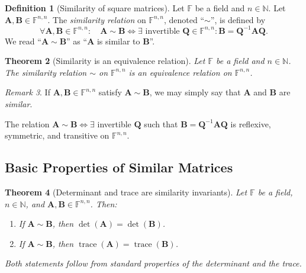 \documentclass[11pt, a4paper, notitlepage]{report}
\newtheorem{theorem}{Theorem}[section]
\theoremstyle{definition}
\newtheorem{definition}[theorem]{Definition}
\theoremstyle{remark}
\newtheorem{remark}[theorem]{Remark}
\begin{document}
\begin{definition}[Similarity of square matrices]\label{def:similarity}
Let $\mathbb{F}$ be a field and $n \in \mathbb{N}$. Let $\mathbf{A}, \mathbf{B} \in
\mathbb{F}^{n,n}$. The \emph{similarity relation} on $\mathbb{F}^{n,n}$, denoted
``$\sim$'', is defined by
\[
  \forall \mathbf{A}, \mathbf{B} \in \mathbb{F}^{n,n} : \quad
  \mathbf{A} \sim \mathbf{B}
  \iff
  \exists \text{ invertible } \mathbf{Q} \in \mathbb{F}^{n,n} : \mathbf{B} = \mathbf{Q}^{-1}\mathbf{A}\mathbf{Q}.
\]
We read ``$\mathbf{A} \sim \mathbf{B}$'' as ``$\mathbf{A}$ is similar to $\mathbf{B}$''.
\end{definition}

\begin{theorem}[Similarity is an equivalence relation]\label{thm:similarity-equiv}
Let $\mathbb{F}$ be a field and $n \in \mathbb{N}$. The similarity relation $\sim$ on
$\mathbb{F}^{n,n}$ is an equivalence relation on $\mathbb{F}^{n,n}$.
\end{theorem}

\begin{remark}
If $\mathbf{A}, \mathbf{B} \in \mathbb{F}^{n,n}$ satisfy $\mathbf{A} \sim \mathbf{B}$, we
may simply say that $\mathbf{A}$ and $\mathbf{B}$ are \emph{similar}.
\end{remark}

\begin{keyresult}[title={Key Result: Similarity is an Equivalence Relation}]
The relation $\mathbf{A} \sim \mathbf{B} \iff \exists$ invertible $\mathbf{Q}$ such that
$\mathbf{B} = \mathbf{Q}^{-1}\mathbf{A}\mathbf{Q}$ is reflexive, symmetric, and transitive
on $\mathbb{F}^{n,n}$.
\end{keyresult}

\subsection{Basic Properties of Similar Matrices}

\begin{theorem}[Determinant and trace are similarity invariants]\label{thm:similarity-invariants}
Let $\mathbb{F}$ be a field, $n \in \mathbb{N}$, and $\mathbf{A}, \mathbf{B} \in
\mathbb{F}^{n,n}$. Then:
\begin{enumerate}
  \item If $\mathbf{A} \sim \mathbf{B}$, then $\det(\mathbf{A}) = \det(\mathbf{B})$.
  \item If $\mathbf{A} \sim \mathbf{B}$, then $\operatorname{trace}(\mathbf{A}) = \operatorname{trace}(\mathbf{B})$.
\end{enumerate}
Both statements follow from standard properties of the determinant and the trace.
\end{theorem}
\end{document}
